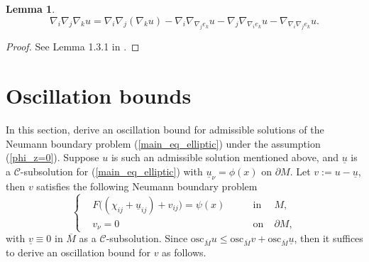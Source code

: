 \documentclass[12pt]{amsart}
\newtheorem{lemma}[theorem]{Lemma}
\theoremstyle{definition}
\theoremstyle{remark}
\numberwithin{equation}{section}
\begin{document}
\begin{lemma}\label{lemma_u_ijk}
	\begin{equation}
	\nabla_i\nabla_j\nabla_k u = \nabla_i\nabla_j (\nabla_k u) - \nabla_i\nabla_{\nabla_j e_k}u - \nabla_j\nabla_{\nabla_i e_k}u
	- \nabla_{\nabla_i\nabla_j e_k}u.
	\end{equation}
\end{lemma}
\begin{proof}
	See Lemma 1.3.1 in \cite{GuoThesis19}.
\end{proof}


\section{Oscillation bounds}\label{osc.sec}
In this section, derive an oscillation bound for admissible solutions of the Neumann boundary problem (\ref{main_eq_elliptic}) under the assumption (\ref{phi_z=0}).
Suppose $u$ is such an admissible solution mentioned above, and $\underline{u}$ is a $\mathcal{C}$-subsolution for (\ref{main_eq_elliptic}) with $\underline{u}_\nu = \phi(x)$ on $\partial M$. Let $v := u - \underline{u}$, then $v$ satisfies the following Neumann boundary problem
\begin{equation}
\left\{
\begin{aligned}
&F\big((\chi_{ij} + \underline{u}_{ij}) + v_{ij}\big) = \psi(x) \qquad &\text{in}\;& M, \\ 
&v_\nu = 0 \qquad &\text{on} \;& \partial M,
\end{aligned}
\right.
\end{equation}
with $\underline{v} \equiv 0$ in $\overline{M}$ as a $\mathcal{C}$-subsolution. Since $\text{osc}_{\overline{M}} u \leq \text{osc}_{\overline{M}} v + \text{osc}_{\overline{M}} \underline{u}$, then it suffices to derive an oscillation bound for $v$ as follows.
\end{document}
